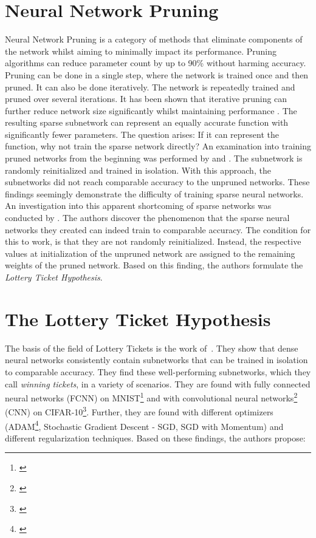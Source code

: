 \section{Neural Network Pruning}
Neural Network Pruning is a category of methods that eliminate components of the network whilst aiming to minimally impact its performance.
Pruning algorithms can reduce parameter count by up to 90\% without harming accuracy.
\autocite{LeCun, OptimalBrainSurgeon, HanEtAl15, PruningFiltersForEfficientConvets}
Pruning can be done in a single step, where the network is trained once and then pruned.
It can also be done iteratively. 
The network is repeatedly trained and pruned over several iterations. 
It has been shown that iterative pruning can further reduce network size significantly whilst maintaining performance \autocite{HanEtAl15}.
The resulting sparse subnetwork can represent an equally accurate function with significantly fewer parameters. 
The question arises: If it can represent the function, why not train the sparse network directly?
An examination into training pruned networks from the beginning was performed by \textcite{PruningFiltersForEfficientConvets} and \textcite{HanEtAl15}.
The subnetwork is randomly reinitialized and trained in isolation.
With this approach, the subnetworks did not reach comparable accuracy to the unpruned networks.
These findings seemingly demonstrate the difficulty of training sparse neural networks.
An investigation into this apparent shortcoming of sparse networks was conducted by \textcite{DBLP:conf/iclr/FrankleC19}.
The authors discover the phenomenon that the sparse neural networks they created can indeed train to comparable accuracy.
The condition for this to work, is that they are not randomly reinitialized. 
Instead, the respective values at initialization of the unpruned network are assigned to the remaining weights of the pruned network. 
Based on this finding, the authors formulate the \textit{Lottery Ticket Hypothesis}.

\section{The Lottery Ticket Hypothesis}
The basis of the field of Lottery Tickets is the work of~\cite{DBLP:conf/iclr/FrankleC19}. 
They show that dense neural networks consistently contain subnetworks that can be trained in isolation to comparable accuracy.
They find these well-performing subnetworks, which they call \textit{winning tickets}, in a variety of scenarios.
They are found with fully connected neural networks (FCNN) on MNIST\footnote{\cite{mnist}} and with convolutional neural networks\footnote{\cite{cnn}} (CNN)  on CIFAR-10\footnote{\cite{cifar}}.
Further, they are found with different optimizers (ADAM\footnote{\cite{ADAM}}, Stochastic Gradient Descent - SGD, SGD with Momentum) and different regularization techniques.
Based on these findings, the authors propose:

